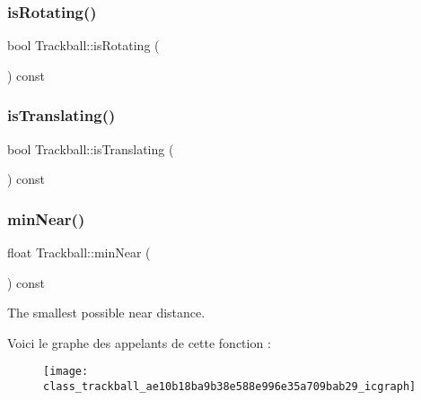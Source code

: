 \subsubsection{\texorpdfstring{is\+Rotating()}{isRotating()}}
{\footnotesize\ttfamily bool Trackball\+::is\+Rotating (\begin{DoxyParamCaption}{ }\end{DoxyParamCaption}) const}

\mbox{\label{class_trackball_ab60138170269b87ee0c131a978e98c4b}} 
\subsubsection{\texorpdfstring{is\+Translating()}{isTranslating()}}
{\footnotesize\ttfamily bool Trackball\+::is\+Translating (\begin{DoxyParamCaption}{ }\end{DoxyParamCaption}) const}

\mbox{\label{class_trackball_ae10b18ba9b38e588e996e35a709bab29}} 
\subsubsection{\texorpdfstring{min\+Near()}{minNear()}}
{\footnotesize\ttfamily float Trackball\+::min\+Near (\begin{DoxyParamCaption}{ }\end{DoxyParamCaption}) const}



The smallest possible near distance. 

Voici le graphe des appelants de cette fonction \+:\nopagebreak
\begin{figure}[H]
\begin{center}
\leavevmode
\texttt{[image: class\_trackball\_ae10b18ba9b38e588e996e35a709bab29\_icgraph]}
\end{center}
\end{figure}
\mbox{\label{class_trackball_ac50d8b300e7c77162c6134986f9a8a50}} 
